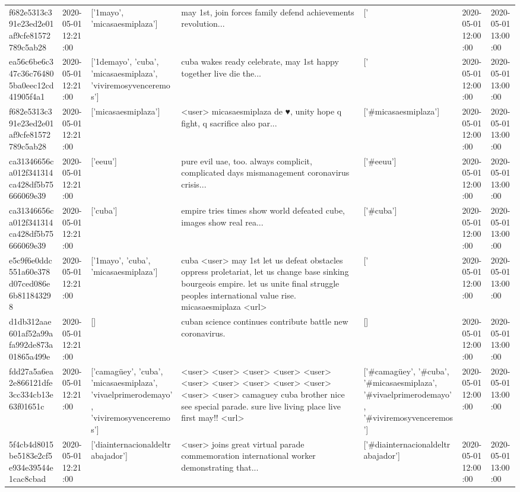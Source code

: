 \begin{tabular}{lllllll}
f682e5313c391e23ed2e01af9cfe81572789c5ab28 & 2020-05-01 12:21:00 & ['1mayo', 'micasaesmiplaza'] & may 1st, join forces family defend achievements revolution... & ['#1mayo', '#micasaesmiplaza'] & 2020-05-01 12:00:00 & 2020-05-01 13:00:00 \\
ea56c6be6c347c36c764805ba0eec12cd41905f4a1 & 2020-05-01 12:21:00 & ['1demayo', 'cuba', 'micasaesmiplaza', 'viviremosyvenceremos'] & cuba wakes ready celebrate, may 1st happy together live die the... & ['#1demayo', '#cuba', '#micasaesmiplaza', '#viviremosyvenceremos'] & 2020-05-01 12:00:00 & 2020-05-01 13:00:00 \\
f682e5313c391e23ed2e01af9cfe81572789c5ab28 & 2020-05-01 12:21:00 & ['micasaesmiplaza'] & <user> micasaesmiplaza de ♥️, unity hope q fight, q sacrifice also par... & ['#micasaesmiplaza'] & 2020-05-01 12:00:00 & 2020-05-01 13:00:00 \\
ca31346656ca012f341314ca428df5b75666069e39 & 2020-05-01 12:21:00 & ['eeuu'] & pure evil uae, too. always complicit, complicated days mismanagement coronavirus crisis... & ['#eeuu'] & 2020-05-01 12:00:00 & 2020-05-01 13:00:00 \\
ca31346656ca012f341314ca428df5b75666069e39 & 2020-05-01 12:21:00 & ['cuba'] & empire tries times show world defeated cube, images show real rea... & ['#cuba'] & 2020-05-01 12:00:00 & 2020-05-01 13:00:00 \\
e5c9f6e0ddc551a60e378d07ced086e6b811843298 & 2020-05-01 12:21:00 & ['1mayo', 'cuba', 'micasaesmiplaza'] & cuba <user> may 1st let us defeat obstacles oppress proletariat, let us change base sinking bourgeois empire. let us unite final struggle peoples international value rise. micasaesmiplaza <url> & ['#1mayo', '#cuba', '#micasaesmiplaza'] & 2020-05-01 12:00:00 & 2020-05-01 13:00:00 \\
d1db312aae601af52a99afa992de873a01865a499e & 2020-05-01 12:21:00 & [] & cuban science continues contribute battle new coronavirus. & [] & 2020-05-01 12:00:00 & 2020-05-01 13:00:00 \\
fdd27a5a6ea2e866121dfe3cc334cb13e63f01651c & 2020-05-01 12:21:00 & ['camagüey', 'cuba', 'micasaesmiplaza', 'vivaelprimerodemayo', 'viviremosyvenceremos'] & <user> <user> <user> <user> <user> <user> <user> <user> <user> <user> <user> <user> camaguey cuba brother nice see special parade. sure live living place live first may!!️ <url> & ['#camagüey', '#cuba', '#micasaesmiplaza', '#vivaelprimerodemayo', '#viviremosyvenceremos'] & 2020-05-01 12:00:00 & 2020-05-01 13:00:00 \\
5f4cb4d8015be5183e2cf5e934e39544e1cac8cbad & 2020-05-01 12:21:00 & ['diainternacionaldeltrabajador'] & <user> joins great virtual parade commemoration international worker demonstrating that... & ['#diainternacionaldeltrabajador'] & 2020-05-01 12:00:00 & 2020-05-01 13:00:00 \\

\end{tabular}
